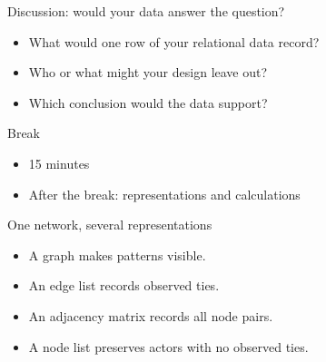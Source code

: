 \documentclass[aspectratio=169,11pt]{beamer}
\begin{document}
\begin{frame}{Discussion: would your data answer the question?}
\begin{itemize}
\item What would one row of your relational data record?
\medskip
\item Who or what might your design leave out?
\medskip
\item Which conclusion would the data support?
\medskip
\end{itemize}

\end{frame}

\begin{frame}{Break}
\begin{itemize}
\item 15 minutes
\medskip
\item After the break: representations and calculations
\medskip
\end{itemize}

\end{frame}

\begin{frame}{One network, several representations}
\begin{itemize}
\item A graph makes patterns visible.
\medskip
\item An edge list records observed ties.
\medskip
\item An adjacency matrix records all node pairs.
\medskip
\item A node list preserves actors with no observed ties.
\medskip
\end{itemize}

\end{frame}
\end{document}
